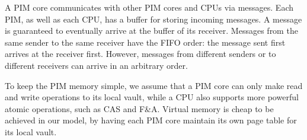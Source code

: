 A PIM core communicates with other PIM cores and CPUs via messages.
Each PIM, as well as each CPU, has a buffer for storing incoming messages.
A message is guaranteed to eventually arrive at the buffer of its receiver.
Messages from the same sender to the same receiver have the FIFO order: 
the message sent first arrives at the receiver first. 
However, messages from different senders or to different receivers can arrive in an arbitrary order. 

To keep the PIM memory simple, we assume that a PIM core can only make read and write operations 
to its local vault, while a CPU also supports more powerful atomic operations, such as CAS and F\&A.
Virtual memory is cheap to be achieved in our model, 
by having each PIM core maintain its own page table for its local vault.